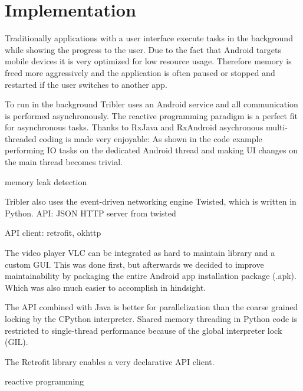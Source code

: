 \chapter{Implementation}




Traditionally applications with a user interface execute tasks in the background while showing the progress to the user.
Due to the fact that Android targets mobile devices it is very optimized for low resource usage.
Therefore memory is freed more aggressively and the application is often paused or stopped and restarted if the user switches to another app.

To run in the background Tribler uses an Android service and all communication is performed asynchronously.
The reactive programming paradigm is a perfect fit for asynchronous tasks.
Thanks to RxJava and RxAndroid asychronous multi-threaded coding is made very enjoyable:
As shown in the code example performing IO tasks on the dedicated Android thread and making UI changes on the main thread becomes trivial.


memory leak detection


Tribler also uses the event-driven networking engine Twisted, which is written in Python.
API: JSON HTTP server from twisted

API client: retrofit, okhttp


The video player VLC can be integrated as hard to maintain library and a custom GUI.
This was done first, but afterwards we decided to improve maintainability by packaging the entire Android app installation package (.apk).
Which was also much easier to accomplish in hindsight.

The API combined with Java is better for parallelization than the coarse grained locking by the CPython interpreter.
Shared memory threading in Python code is restricted to single-thread performance because of the global interpreter lock (GIL).


The Retrofit library enables a very declarative API client.

reactive programming



